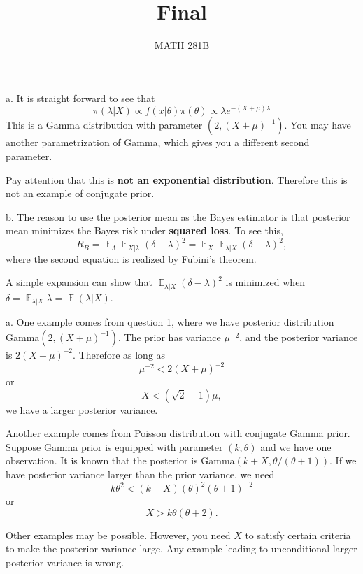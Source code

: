 \documentclass[12pt]{article}
\newcommand{\1}{\mathbbm{1}}
\newenvironment{problem}[2][Problem]{\begin{trivlist}
\item[\hskip \labelsep {\bfseries #1}\hskip \labelsep {\bfseries #2.}]}{\end{trivlist}}
\newcommand{\E}{\operatorname{\mathbb{E}}}
\begin{document}
\title{Final}%
\author{MATH 281B} %
\maketitle
\begin{problem}{1}
\end{problem}

a. It is straight forward to see that
$$
\pi (\lambda|X) \propto f(x|\theta) \pi(\theta) \propto \lambda e^{-(X + \mu) \lambda}
$$
This is a Gamma distribution with parameter $(2, (X+\mu)^{-1})$. You may have another parametrization of Gamma, which gives you a different second parameter. 

Pay attention that this is \textbf{not an exponential distribution}. Therefore this is not an example of conjugate prior.

b. The reason to use the posterior mean as the Bayes estimator is that posterior mean minimizes the Bayes risk under \textbf{squared loss}. To see this,
$$
R_B = \E_{\Lambda} \E_{X|\lambda} (\delta - \lambda)^2 = \E_{X} \E_{\lambda|X} (\delta - \lambda)^2,
$$
where the second equation is realized by Fubini's theorem.

A simple expansion can show that $ \E_{\lambda|X} (\delta - \lambda)^2 $ is minimized when $\delta = \E_{\lambda|X} \lambda  = \E(\lambda |X)$.

\begin{problem}{2}
\end{problem}

a. One example comes from question 1, where we have posterior distribution Gamma$(2, (X+\mu)^{-1})$. The prior has variance $\mu^{-2}$, and the posterior variance is $2(X+\mu)^{-2}$. Therefore as long as
$$
\mu^{-2} < 2(X+\mu)^{-2}
$$
or 
$$
X < (\sqrt 2 - 1)\mu,
$$
we have a larger posterior variance.

Another example comes from Poisson distribution with conjugate Gamma prior. Suppose Gamma prior is equipped with parameter $(k,\theta)$ and we have one observation. It is known that the posterior is Gamma$(k+X, \theta/(\theta +1))$. If we have posterior variance larger than the prior variance, we need
$$
k\theta^2 < (k+X)(\theta)^2(\theta+1)^{-2}
$$
or
$$
X > k\theta(\theta+2).
$$

Other examples may be possible. However, you need $X$ to satisfy certain criteria to make the posterior variance large. Any example leading to unconditional larger posterior variance is wrong.
\end{document}
